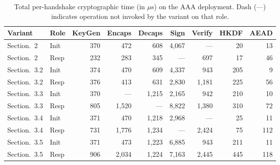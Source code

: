 \documentclass{easychair}
\newcommand{\VarSecShort}[1]{Section.~#1}
\begin{document}
\begin{table}[h]
\centering
\footnotesize
\caption{Total per-handshake cryptographic time (in $\mu$s) on the AAA
deployment. Dash (---) indicates operation not invoked by the variant
on that role.}
\label{tab:operations}
\begin{tabular}{llrrrrrrr}
\toprule
\textbf{Variant} & \textbf{Role} & \textbf{KeyGen} & \textbf{Encaps} & \textbf{Decaps} & \textbf{Sign} & \textbf{Verify} & \textbf{HKDF} & \textbf{AEAD} \\
\midrule
\VarSecShort{2}   & Init & 370 &    472 &  608 & 4{,}067 & ---       &  20 &  13 \\
\VarSecShort{2}   & Resp & 232 &    283 &  345 & ---     &    697    &  17 &  46 \\
\VarSecShort{3.2} & Init & 374 &    470 &  609 & 4{,}337 &    943    & 205 &   9 \\
\VarSecShort{3.2} & Resp & 376 &    413 &  631 & 2{,}830 & 1{,}181   & 225 &  56 \\
\VarSecShort{3.3} & Init & 370 & ---    & 1{,}215 & 2{,}165 &    942 & 210 &  10 \\
\VarSecShort{3.3} & Resp & 805 & 1{,}520 & ---    & 8{,}822 & 1{,}380 & 310 &  72 \\
\VarSecShort{3.4} & Init & 371 &    470 & 1{,}218 & 2{,}968 & ---     &  25 &  11 \\
\VarSecShort{3.4} & Resp & 731 & 1{,}776 & 1{,}234 & ---     & 2{,}424 &  75 & 112 \\
\VarSecShort{3.5} & Init & 371 &    473 & 1{,}223 & 6{,}885 &    943  & 211 &  11 \\
\VarSecShort{3.5} & Resp & 906 & 2{,}034 & 1{,}224 & 7{,}163 & 2{,}445 & 445 & 118 \\
\bottomrule
\end{tabular}
\end{table}
\end{document}
